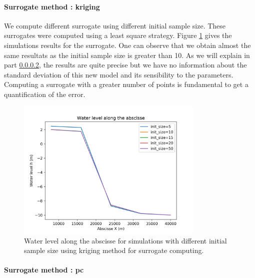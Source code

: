 \paragraph{Surrogate method : kriging}
\hspace{1cm}

We compute different surrogate using different initial sample size. These surrogates were computed using a least square strategy. Figure \ref{influence_init_size_method_surrogate_kriging} gives the simulations results for the surrogate. One can observe that we obtain almost the same resultats as the initial sample size is greater than 10. As we will explain in part \ref{}, the results are quite precise but we have no information about the standard deviation of this new model and its sensibility to the parameters. Computing a surrogate with a greater number of points is fundamental to get a quantification of the error.

\begin{figure}
  \centering
  \includegraphics[width=0.8\textwidth]{images/influence_init_size_method_surrogate_kriging.png}
  \caption{Water level along the abscisse for simulations with different initial sample size using kriging method for surrogate computing.}
  	\label{influence_init_size_method_surrogate_kriging}
\end{figure}

\paragraph{Surrogate method : pc}
\hspace{1cm}

